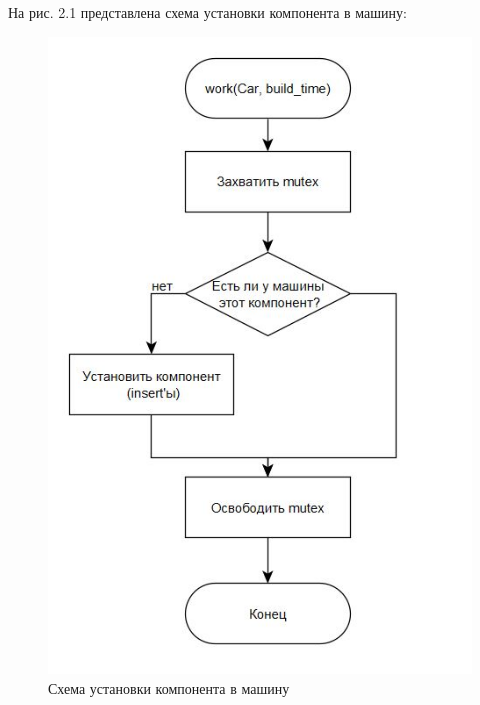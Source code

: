 \documentclass[12pt]{report}
\begin{document}
На рис. 2.1 представлена схема установки компонента в машину:
	\begin{figure}[h]
        	\begin{center}
        		\includegraphics[scale=0.7]{1}
        		\caption{Схема установки компонента в машину}
        		\label{fig:def}
        	\end{center}
        \end{figure}
\end{document}
